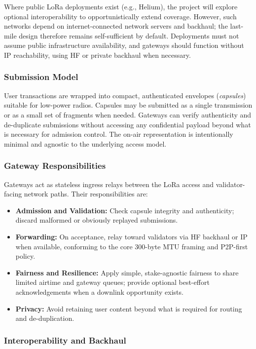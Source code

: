 \documentclass{article}
\begin{document}
Where public LoRa deployments exist (e.g., Helium), the project will explore optional interoperability to opportunistically extend coverage. However, such networks depend on internet-connected network servers and backhaul; the last-mile design therefore remains self-sufficient by default. Deployments must not assume public infrastructure availability, and gateways should function without IP reachability, using HF or private backhaul when necessary.

\subsubsection{Submission Model}

User transactions are wrapped into compact, authenticated envelopes (\emph{capsules}) suitable for low-power radios. Capsules may be submitted as a single transmission or as a small set of fragments when needed. Gateways can verify authenticity and de-duplicate submissions without accessing any confidential payload beyond what is necessary for admission control. The on-air representation is intentionally minimal and agnostic to the underlying access model.

\subsubsection{Gateway Responsibilities}

Gateways act as stateless ingress relays between the LoRa access and validator-facing network paths. Their responsibilities are:
\begin{itemize}
    \item \textbf{Admission and Validation:} Check capsule integrity and authenticity; discard malformed or obviously replayed submissions.
    \item \textbf{Forwarding:} On acceptance, relay toward validators via HF backhaul or IP when available, conforming to the core 300-byte MTU framing and P2P-first policy.
    \item \textbf{Fairness and Resilience:} Apply simple, stake-agnostic fairness to share limited airtime and gateway queues; provide optional best-effort acknowledgements when a downlink opportunity exists.
    \item \textbf{Privacy:} Avoid retaining user content beyond what is required for routing and de-duplication.
\end{itemize}

\subsubsection{Interoperability and Backhaul}
\end{document}
